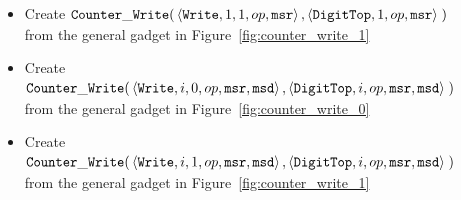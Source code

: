 \begin{itemize}
\begin{itemize}
        \item Create
        $\begin{aligned}[t]
            {\tt Counter\_Write}(& \left\langle {\tt Write},    1, 1, op, {\tt msr} \right\rangle,
                      \left\langle {\tt DigitTop}, 1,    op, {\tt msr} \right\rangle \;)
        \end{aligned}$ \\ from the general gadget in Figure~\ref{fig:counter_write_1}

        \item Create
        $\begin{aligned}[t]
            {\tt Counter\_Write}(& \left\langle {\tt Write},    i, 0, op, {\tt msr}, {\tt msd}\right\rangle,
                      \left\langle {\tt DigitTop}, i,    op, {\tt msr}, {\tt msd}\right\rangle \;)
        \end{aligned}$ \\ from the general gadget in Figure~\ref{fig:counter_write_0}

        \item Create
        $\begin{aligned}[t]
            {\tt Counter\_Write}(& \left\langle {\tt Write},    i, 1, op, {\tt msr}, {\tt msd}\right\rangle,
                      \left\langle {\tt DigitTop}, i,    op, {\tt msr}, {\tt msd}\right\rangle \;)
        \end{aligned}$ \\ from the general gadget in Figure~\ref{fig:counter_write_1}
    \end{itemize}

\end{itemize}

\vspace{.5cm}

